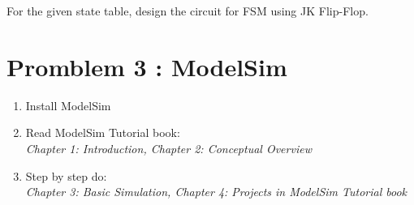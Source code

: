 \documentclass{vhdl-assignment}
\begin{document}
For the given state table, design the circuit for FSM using JK Flip-Flop.

\section*{Promblem 3 : ModelSim}

\begin{enumerate}
    \item Install ModelSim
    \item Read ModelSim Tutorial book: \\
    \emph{Chapter 1: Introduction, Chapter 2: Conceptual Overview}
    \item Step by step do: \\
    \emph{Chapter 3: Basic Simulation, Chapter 4: Projects in ModelSim Tutorial book}
\end{enumerate}
\end{document}
